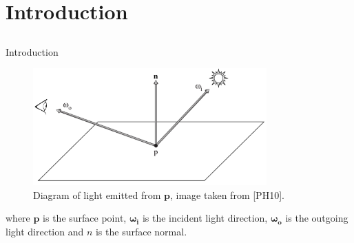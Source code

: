 \documentclass{beamer}
\begin{document}
\section{Introduction}
\subsection{ }

\begin{frame}{Introduction}

\begin{figure}[b!]
\includegraphics[width=0.8\textwidth]{img/render_definition}
\caption*{\tiny{Diagram of light emitted from $\mathbf{p}$, image taken from [PH10].}}
\end{figure}

\vfill

\small{where $\mathbf{p}$ is the surface point, $\boldsymbol{\omega_i}$ is the incident light direction, $\boldsymbol{\omega_o}$ is the outgoing light direction and $n$ is the surface normal. }

\end{frame}
\end{document}
